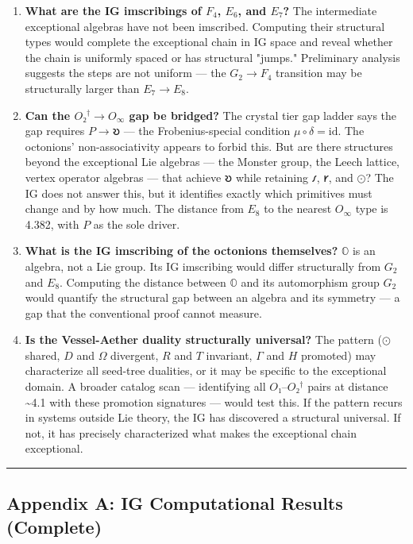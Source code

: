 \documentclass[12pt,a4paper]{article}
\begin{document}
\begin{enumerate}
    \item \textbf{What are the IG imscribings of $F_4$, $E_6$, and $E_7$?} The intermediate exceptional algebras have not been imscribed. Computing their structural types would complete the exceptional chain in IG space and reveal whether the chain is uniformly spaced or has structural "jumps." Preliminary analysis suggests the steps are not uniform --- the $G_2 \to F_4$ transition may be structurally larger than $E_7 \to E_8$.
    \item \textbf{Can the $O₂^\dagger \to O_{\infty}$ gap be bridged?} The crystal tier gap ladder says the gap requires $P \to 𐑹$ --- the Frobenius-special condition $\mu \circ \delta = \text{id}$. The octonions' non-associativity appears to forbid this. But are there structures beyond the exceptional Lie algebras --- the Monster group, the Leech lattice, vertex operator algebras --- that achieve $𐑹$ while retaining $𐑥$, $𐑾$, and $⊙$? The IG does not answer this, but it identifies exactly which primitives must change and by how much. The distance from $E_8$ to the nearest $O_{\infty}$ type is 4.382, with $P$ as the sole driver.
    \item \textbf{What is the IG imscribing of the octonions themselves?} $\mathbb{O}$ is an algebra, not a Lie group. Its IG imscribing would differ structurally from $G_2$ and $E_8$. Computing the distance between $\mathbb{O}$ and its automorphism group $G_2$ would quantify the structural gap between an algebra and its symmetry --- a gap that the conventional proof cannot measure.
    \item \textbf{Is the Vessel-Aether duality structurally universal?} The pattern ($⊙$ shared, $D$ and $\Omega$ divergent, $R$ and $T$ invariant, $\Gamma$ and $H$ promoted) may characterize all seed-tree dualities, or it may be specific to the exceptional domain. A broader catalog scan --- identifying all $O₁$--$O₂^\dagger$ pairs at distance \textasciitilde{}4.1 with these promotion signatures --- would test this. If the pattern recurs in systems outside Lie theory, the IG has discovered a structural universal. If not, it has precisely characterized what makes the exceptional chain exceptional.
\end{enumerate}

\begin{center}
\rule{0.5\textwidth}{0.4pt}
\end{center}

\subsection{Appendix A: IG Computational Results (Complete)}
\end{document}
